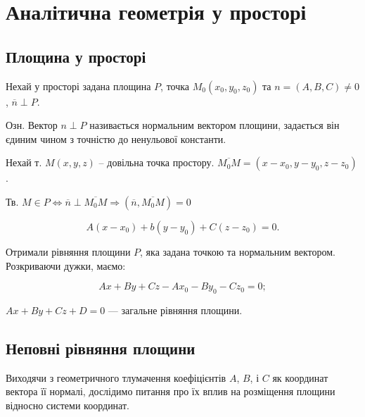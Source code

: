 \chapter{Аналітична геометрія у просторі}




\section{Площина у просторі}

Нехай у просторі задана площина $P$, точка $M_0(x_0,y_0,z_0)$ та
$n = (A,B,C) \neq 0$, $\overline{n} \perp P$.

Озн. Вектор $n \perp P$ називається нормальним вектором площини,
задається він єдиним чином з точністю до ненульової константи.







Нехай т. $M(x,y,z)$ -- довільна точка простору.
$\overline{M_0 M} = (x-x_0,y-y_0,z-z_0)$.

Тв. $M \in P \Leftrightarrow \overline{n} \perp \overline{M_0 M} \Rightarrow (\overline{n},\overline{M_0 M}) = 0$


$$A(x - x_0) + b(y - y_0) + C(z - z_0) = 0.$$

Отримали рівняння площини $P$, яка задана
точкою та нормальним вектором. Розкриваючи
дужки, маємо:

$$Ax + By + Cz - Ax_0 - By_0 - Cz_0 = 0;$$

$Ax + By + Cz + D = 0$ --- загальне рівняння
площини.


\section{Неповні рівняння площини}

Виходячи з геометричного тлумачення коефіцієнтів $A$, $B$, і $C$ як
координат вектора її нормалі, дослідимо питання про їх вплив на розміщення
площини відносно системи координат.

